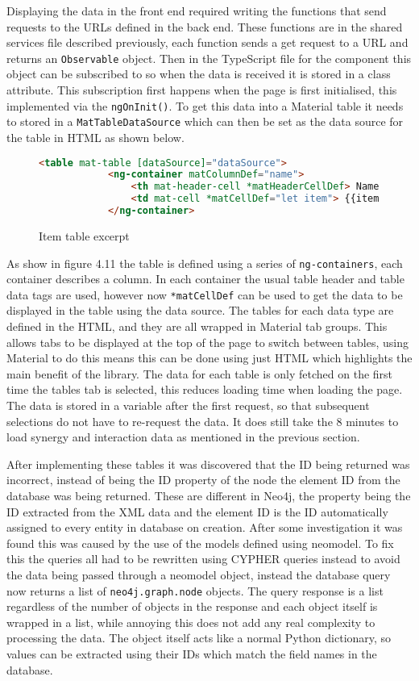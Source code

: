 Displaying the data in the front end required writing the functions that send requests to the URLs defined in the back end. 
These functions are in the shared services file described previously, each function sends a get request to a URL and returns an \verb|Observable| 
object. Then in the TypeScript file for the component this object can be subscribed to so when the data is received it is stored in a class attribute. 
This subscription first happens when the page is first initialised, this implemented via the \verb|ngOnInit()|. To get this data into a Material table it needs to 
stored in a \verb|MatTableDataSource| which can then be set as the data source for the table in HTML as shown below. 
\begin{figure}[H]
    \begin{lstlisting}[language=HTML]
        <table mat-table [dataSource]="dataSource">
            <ng-container matColumnDef="name">
                <th mat-header-cell *matHeaderCellDef> Name </th>
                <td mat-cell *matCellDef="let item"> {{item.name}} </td>
            </ng-container>
    \end{lstlisting}
    \caption{Item table excerpt}
\end{figure}
As show in figure 4.11 the table is defined using a series of \verb|ng-containers|, each container describes a column.
In each container the usual table header and table data tags are used, however now \verb|*matCellDef| can be used to get the data to be 
displayed in the table using the data source. The tables for each data type are defined in the HTML, and they are all wrapped in Material 
tab groups. This allows tabs to be displayed at the top of the page to switch between tables, using Material to do this means this can be done 
using just HTML which highlights the main benefit of the library. The data for each table is only fetched on the first time the tables tab is selected, 
this reduces loading time when loading the page. The data is stored in a variable after the first request, so that subsequent selections do not have to 
re-request the data. It does still take the 8 minutes to load synergy and interaction data as mentioned in the previous section.

After implementing these tables it was discovered that the ID being returned was incorrect, instead of being the ID property of the node the 
element ID from the database was being returned. These are different in Neo4j, the property being the ID extracted from the XML data and the element ID is the 
ID automatically assigned to every entity in database on creation. After some investigation it was found this was caused by the use of 
the models defined using neomodel. To fix this the queries all had to be rewritten using CYPHER queries instead to avoid the data being passed through 
a neomodel object, instead the database query now returns a list of \verb|neo4j.graph.node| objects. The query response is a list regardless of 
the number of objects in the response and each object itself is wrapped in a list, while annoying this does not add any real complexity to processing the data. 
The object itself acts like a normal Python dictionary, so values can be extracted using their IDs which match the field names in the database.
